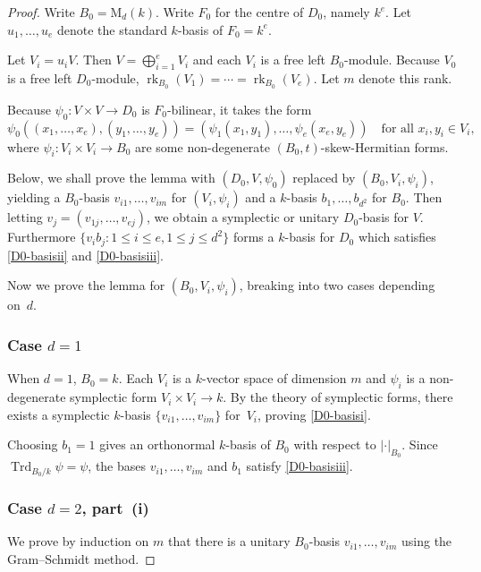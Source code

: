 \documentclass[11pt]{article}
\numberwithin{equation}{section}
\newcommand{\rM}{\mathrm{M}}
\DeclareMathOperator{\rk}{rk}
\DeclareMathOperator{\Trd}{Trd}
\newcommand{\abs}[1]{\lvert #1 \rvert}
\begin{document}
\begin{proof}
Write $B_0 = \rM_d(k)$.
Write $F_0$ for the centre of $D_0$, namely $k^e$.
Let $u_1, \dotsc, u_e$ denote the standard $k$-basis of $F_0 = k^e$.

Let $V_i = u_i V$.
Then $V = \bigoplus_{i=1}^e V_i$ and each $V_i$ is a free left $B_0$-module.
Because $V_0$ is a free left $D_0$-module, $\rk_{B_0}(V_1) = \dotsb = \rk_{B_0}(V_e)$.
Let $m$ denote this rank.

Because $\psi_0 : V \times V \to D_0$ is $F_0$-bilinear, it takes the form
\[
\psi_0((x_1, \dotsc, x_e), (y_1, \dotsc, y_e)) = (\psi_1(x_1, y_1), \dotsc, \psi_e(x_e, y_e)) \quad\text{for all } x_i, y_i \in V_i,
\]
where $\psi_i \colon V_i \times V_i \to B_0$ are some non-degenerate $(B_0, t)$-skew-Hermitian forms.

Below, we shall prove the lemma with $(D_0, V, \psi_0)$ replaced by $(B_0, V_i, \psi_i)$, yielding a $B_0$-basis $v_{i1}, \dotsc, v_{im}$ for $(V_i, \psi_i)$ and a $k$-basis $b_1, \dotsc, b_{d^2}$ for $B_0$.
Then letting \hbox{$v_j = (v_{1j}, \dotsc, v_{ej})$}, we obtain a symplectic or unitary $D_0$-basis for $V$.
Furthermore $\{ v_i b_j : 1 \leq i \leq e, 1 \leq j \leq d^2 \}$ forms a $k$-basis for $D_0$ which satisfies \eqref{D0-basisii} and \eqref{D0-basisiii}.

Now we prove the lemma for $(B_0, V_i, \psi_i)$, breaking into two cases depending on~$d$.

\subsubsection*{Case $d=1$}
When $d=1$, $B_0=k$.
Each $V_i$ is a $k$-vector space of dimension $m$ and $\psi_i$ is a non-degenerate symplectic form $V_i \times V_i \to k$.
By the theory of symplectic forms, there exists a symplectic $k$-basis $\{ v_{i1}, \dotsc, v_{im} \}$ for~$V_i$, proving \eqref{D0-basisi}.

Choosing $b_1 = 1$ gives an orthonormal $k$-basis of $B_0$ with respect to $\abs{\cdot}_{B_0}$.
Since $\Trd_{B_0/k} \psi = \psi$, the bases $v_{i1}, \dotsc, v_{im}$ and $b_1$ satisfy \eqref{D0-basisiii}.

\subsubsection*{Case $d=2$, part~(i)}
We prove by induction on $m$ that there is a unitary $B_0$-basis $v_{i1}, \dotsc, v_{im}$ using the Gram--Schmidt method.


\end{proof}
\end{document}
